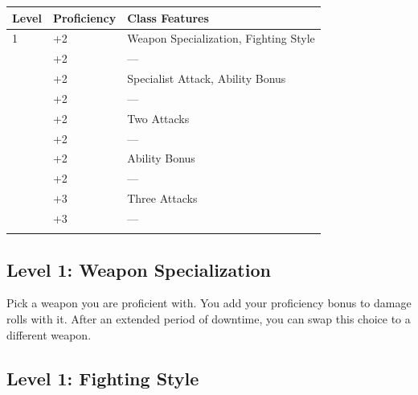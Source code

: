 \documentclass[12pt,letterpaper,twocolumn,openany,nodeprecatedcode,bg=none]{dndbook}
\let\oldsubsection\subsection
\renewcommand{\subsection}[1]{%
  \needspace{5\baselineskip}%
  \oldsubsection{#1}%
}
\begin{document}

{\def\LTcaptype{none} %
\begin{table}[!htbp]
\centering
\begin{tabular}{@{}
  >{\raggedright\arraybackslash}p{}
  >{\raggedright\arraybackslash}p{}
  >{\raggedright\arraybackslash}p{}@{}}
\toprule\noalign{}
\begin{minipage}[b]{\linewidth}\raggedright
Level
\end{minipage} & \begin{minipage}[b]{\linewidth}\raggedright
Proficiency
\end{minipage} & \begin{minipage}[b]{\linewidth}\raggedright
Class Features
\end{minipage} \\
\midrule\noalign{}
1 & +2 & Weapon Specialization, Fighting Style \\
2 & +2 & --- \\
3 & +2 & Specialist Attack, Ability Bonus \\
4 & +2 & --- \\
5 & +2 & Two Attacks \\
6 & +2 & --- \\
7 & +2 & Ability Bonus \\
8 & +2 & --- \\
9 & +3 & Three Attacks \\
10 & +3 & --- \\
\bottomrule\noalign{}
\end{tabular}
\end{table}
}

\subsection{Level 1: Weapon
Specialization}\label{level-1-weapon-specialization}

Pick a weapon you are proficient with. You add your proficiency bonus to
damage rolls with it. After an extended period of downtime, you can swap
this choice to a different weapon.

\subsection{Level 1: Fighting Style}\label{level-1-fighting-style}
\end{document}
